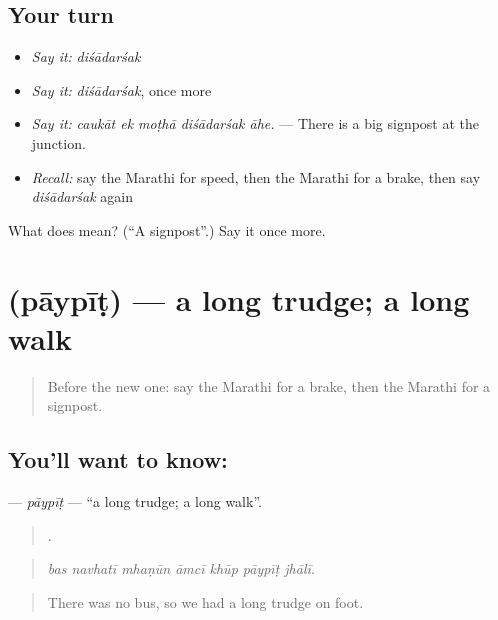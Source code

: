 \subsection*{Your turn}
\begin{itemize}
\raggedright
  \item \emph{Say it:} \emph{diśādarśak}
  \item \emph{Say it:} \emph{diśādarśak}, once more
  \item \emph{Say it:} \emph{caukāt ek moṭhā diśādarśak āhe.} — There is a big signpost at the junction.
  \item \emph{Recall:} say the Marathi for speed, then the Marathi for a brake, then say \emph{diśādarśak} again
\end{itemize}

\begin{tcolorbox}[breakable,colback=teal!4,colframe=teal!35!black,title={Before you move on}]
What does  mean? (\textquotedblleft{}A signpost\textquotedblright{}.) Say it once more.
\end{tcolorbox}
\section[\texorpdfstring{\mr{पायपीट} (pāypīṭ)}{पायपीट (pāypīṭ)}]{ (pāypīṭ) — a long trudge; a long walk}

\label{lesson:MR-C407-paypit}



\begin{quote}
Before the new one: say the Marathi for a brake, then the Marathi for a signpost.
\end{quote}

\subsection*{You'll want to know: }
\textbf{} — \emph{pāypīṭ} — \textquotedblleft{}a long trudge; a long walk\textquotedblright{}.

\begin{quote}
      .
\end{quote}

\begin{quote}
\emph{bas navhatī mhaṇūn āmcī khūp pāypīṭ jhālī.}
\end{quote}

\begin{quote}
There was no bus, so we had a long trudge on foot.
\end{quote}

